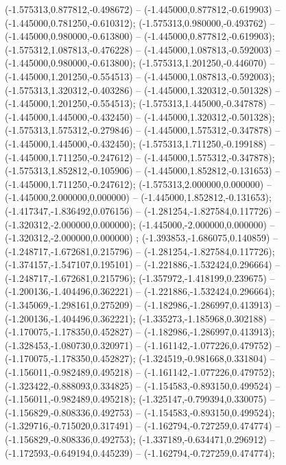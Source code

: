  (-1.575313,0.877812,-0.498672) -- (-1.445000,0.877812,-0.619903) -- (-1.445000,0.781250,-0.610312);
 (-1.575313,0.980000,-0.493762) -- (-1.445000,0.980000,-0.613800) -- (-1.445000,0.877812,-0.619903);
 (-1.575312,1.087813,-0.476228) -- (-1.445000,1.087813,-0.592003) -- (-1.445000,0.980000,-0.613800);
 (-1.575313,1.201250,-0.446070) -- (-1.445000,1.201250,-0.554513) -- (-1.445000,1.087813,-0.592003);
 (-1.575313,1.320312,-0.403286) -- (-1.445000,1.320312,-0.501328) -- (-1.445000,1.201250,-0.554513);
 (-1.575313,1.445000,-0.347878) -- (-1.445000,1.445000,-0.432450) -- (-1.445000,1.320312,-0.501328);
 (-1.575313,1.575312,-0.279846) -- (-1.445000,1.575312,-0.347878) -- (-1.445000,1.445000,-0.432450);
 (-1.575313,1.711250,-0.199188) -- (-1.445000,1.711250,-0.247612) -- (-1.445000,1.575312,-0.347878);
 (-1.575313,1.852812,-0.105906) -- (-1.445000,1.852812,-0.131653) -- (-1.445000,1.711250,-0.247612);
 (-1.575313,2.000000,0.000000) -- (-1.445000,2.000000,0.000000) -- (-1.445000,1.852812,-0.131653);
 (-1.417347,-1.836492,0.076156) -- (-1.281254,-1.827584,0.117726) -- (-1.320312,-2.000000,0.000000);
 (-1.445000,-2.000000,0.000000) -- (-1.320312,-2.000000,0.000000) ;
 (-1.393853,-1.686075,0.140859) -- (-1.248717,-1.672681,0.215796) -- (-1.281254,-1.827584,0.117726);
 (-1.374157,-1.547107,0.195101) -- (-1.221886,-1.532424,0.296664) -- (-1.248717,-1.672681,0.215796);
 (-1.357972,-1.418199,0.239675) -- (-1.200136,-1.404496,0.362221) -- (-1.221886,-1.532424,0.296664);
 (-1.345069,-1.298161,0.275209) -- (-1.182986,-1.286997,0.413913) -- (-1.200136,-1.404496,0.362221);
 (-1.335273,-1.185968,0.302188) -- (-1.170075,-1.178350,0.452827) -- (-1.182986,-1.286997,0.413913);
 (-1.328453,-1.080730,0.320971) -- (-1.161142,-1.077226,0.479752) -- (-1.170075,-1.178350,0.452827);
 (-1.324519,-0.981668,0.331804) -- (-1.156011,-0.982489,0.495218) -- (-1.161142,-1.077226,0.479752);
 (-1.323422,-0.888093,0.334825) -- (-1.154583,-0.893150,0.499524) -- (-1.156011,-0.982489,0.495218);
 (-1.325147,-0.799394,0.330075) -- (-1.156829,-0.808336,0.492753) -- (-1.154583,-0.893150,0.499524);
 (-1.329716,-0.715020,0.317491) -- (-1.162794,-0.727259,0.474774) -- (-1.156829,-0.808336,0.492753);
 (-1.337189,-0.634471,0.296912) -- (-1.172593,-0.649194,0.445239) -- (-1.162794,-0.727259,0.474774);
